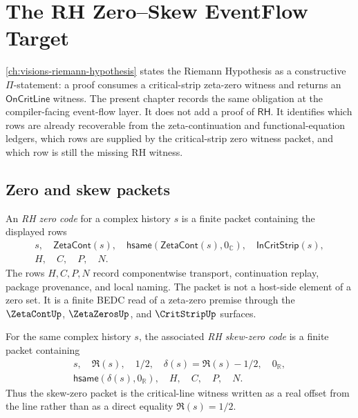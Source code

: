 \chapter{The RH Zero--Skew EventFlow Target}
\label{ch:visions-rh-zero-skew-eventflow-target}

\autoref{ch:visions-riemann-hypothesis} states the Riemann Hypothesis as a
constructive $\Pi$-statement: a proof consumes a critical-strip zeta-zero
witness and returns an $\mathsf{OnCritLine}$ witness.  The present chapter
records the same obligation at the compiler-facing event-flow layer.  It does
not add a proof of $\mathsf{RH}$.  It identifies which rows are already
recoverable from the zeta-continuation and functional-equation ledgers, which
rows are supplied by the critical-strip zero witness packet, and which row is
still the missing RH witness.

\section{Zero and skew packets}
\label{sec:rh-zero-skew-packets}

\begin{definition}
\label{def:rh-zero-code}
An \emph{RH zero code} for a complex history $s$ is a finite packet
containing the displayed rows
$$
\begin{gathered}
s,\quad
\mathsf{ZetaCont}(s),\quad
\mathsf{hsame}(\mathsf{ZetaCont}(s),0_{\mathbb C}),\quad
\mathsf{InCritStrip}(s),\\
H,\quad C,\quad P,\quad N.
\end{gathered}
$$
The rows $H,C,P,N$ record componentwise transport, continuation replay,
package provenance, and local naming.  The packet is not a host-side element
of a zero set.  It is a finite BEDC read of a zeta-zero premise through the
$\ZetaContUp$, $\ZetaZerosUp$, and $\CritStripUp$ surfaces.
\end{definition}

\begin{definition}
\label{def:rh-skew-zero-code}
For the same complex history $s$, the associated \emph{RH skew-zero code} is a
finite packet containing
$$
\begin{gathered}
s,\quad
\Re(s),\quad
1/2,\quad
\delta(s)=\Re(s)-1/2,\quad
0_{\mathbb R},\\
\mathsf{hsame}(\delta(s),0_{\mathbb R}),\quad
H,\quad C,\quad P,\quad N.
\end{gathered}
$$
Thus the skew-zero packet is the critical-line witness written as a real
offset from the line rather than as a direct equality $\Re(s)=1/2$.
\end{definition}

